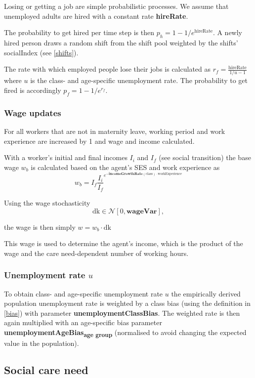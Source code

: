 \documentclass{article}
\newcommand{\marginnote}[1]{\protect\marginpar{\small\texttt{#1}}}
\begin{document}
Losing or getting a job are simple probabilistic processes. We assume that unemployed adults are hired with a constant rate \textbf{hireRate}. 

The probability to get hired per time step is then $p_h=1-1/e^\textrm{hireRate}$. A newly hired person draws a random shift from the shift pool weighted by the shifts' \textsf{socialIndex} (see \ref{shifts}).

The rate with which employed people lose their jobs is calculated as $r_f = \frac{\textrm{hireRate}}{1/u - 1}$ where $u$ is the class- and age-specific unemployment rate. The probability to get fired is accordingly $p_f = 1-1/e^{r_f}$. 


\subsubsection*{Wage updates}

For all workers that are not in maternity leave, working period and work experience are increased by 1 and wage and income calculated.

With a worker's initial and final incomes $I_i$ and $I_f$ (see social transition) the base wage $w_b$ is calculated based on the agent's SES and work experience as
\[
w_b = I_f \frac{I_i}{I_f}^{e^{-\mathbf{incomeGrowthRate}(\mathrm{class})\cdot \mathrm{workExperience}}}
\]

Using the wage stochasticity
\[
\mathrm{dk} \in \mathcal{N}[0, \mathbf{wageVar}],
\]

the wage is then simply $w=w_b \cdot \mathrm{dk}$

This wage is used to determine the agent's income, which is the product of the wage and the care need-dependent number of working hours.

\subsubsection*{Unemployment rate $u$}

To obtain class- and age-specific unemployment rate $u$ the empirically derived population unemployment rate is weighted by a class bias (using the definition in \ref{bias}) with parameter \textbf{unemploymentClassBias}. The weighted rate is then again multiplied with an age-specific bias parameter \textbf{unemploymentAgeBias}\textsubscript{\textbf{age group}} (normalised to avoid changing the expected value in the population).

\subsection{Social care need \marginnote{SocialCare.jl}}
\end{document}

